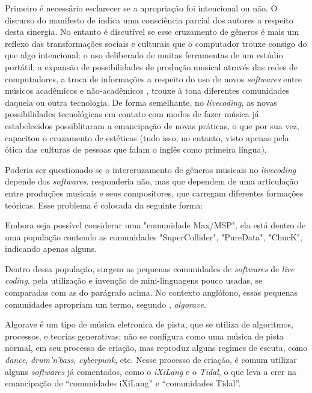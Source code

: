 Primeiro é necessário esclarecer se a apropriação foi intencional ou não.  O discurso do manifesto de  indica uma consciência parcial dos autores a respeito desta sinergia. No entanto é discutível se esse cruzamento de gêneros é mais um reflexo das transformações sociais e culturais que o computador trouxe consigo do que algo intencional: o uso deliberado de muitas ferramentas de um estúdio portátil, a expansão de possibilidades de produção musical através das redes de computadores, a troca de informações a respeito do uso de novos \emph{softwares} entre músicos acadêmicos e não-acadêmicos , trouxe à tona diferentes comunidades daquela ou outra tecnologia. De forma semelhante, no \emph{livecoding}, as novas possibilidades tecnológicas em contato com modos de fazer música já estabelecidos possiblitaram a emancipação de novas práticas, o que por sua vez, capacitou o cruzamento de estéticas (tudo isso, no entanto, visto apenas pela ótica das culturas de pessoas que falam o inglês como primeira língua).

Poderia ser questionado se o intercruzamento de gêneros musicais no \emph{livecoding} depende dos \emph{softwares}.   responderia não, mas que dependem de uma articulação entre produções musicais e seus compositores, que carregam diferentes formações teóricas. Esse problema é colocada da seguinte forma:


Embora seja possível considerar uma "comunidade Max/MSP", ela está dentro de uma população contendo as comunidades "SuperCollider", "PureData", "ChucK", indicando apenas alguns. 

Dentro dessa população, surgem as pequenas comunidades de \emph{softwares} de \emph{live coding}, pela utilização e invenção de mini-linguagens pouco usadas, se comparadas com as do parágrafo acima. No contexto anglófono, essas pequenas comunidades apropriam um termo, segundo , \emph{algorave}. 

Algorave é  um tipo de música eletronica de pista, que se utiliza de algoritmos, processos, e teorias generativas;  não se configura como uma música de pista normal, em seu processo de criação, mas reproduz alguns regimes de escuta, como \emph{dance}, \emph{drum'n'bass}, \emph{cyberpunk}, etc. Nesse processo de criação, é comum utilizar alguns \emph{softwares} já comentados, como o \emph{iXiLang} e o \emph{Tidal}, o que leva a crer na emancipação de ``comunidades iXiLang'' e ``comunidades Tidal''.


